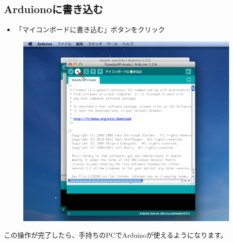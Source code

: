 \documentclass[11pt,a4paper]{jarticle}
\begin{document}
\newpage

\subsection*{Arduionoに書き込む}
\begin{itemize}
\item 「マイコンボードに書き込む」ボタンをクリック
\end{itemize}

 \begin{figure}[h]
 \centering
 \includegraphics[width=0.63\columnwidth]{img/firmata6.eps}
\end{figure}

この操作が完了したら、手持ちのPCでArduinoが使えるようになります。


\end{document}
